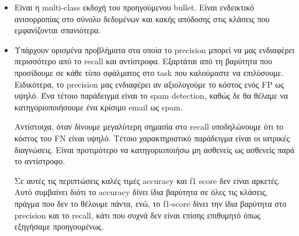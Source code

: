\begin{itemize}
	\item Είναι η multi-class εκδοχή του προηγούμενου bullet. Είναι ενδεικτικό ανισορροπίας στο σύνολο δεδομένων και κακής απόδοσης στις κλάσεις που εμφανίζονται σπανιότερα. 
	
	\item Υπάρχουν ορισμένα προβλήματα στα οποία το precision μπορεί να μας ενδιαφέρει περισσότερο από το recall και αντίστροφα. Εξαρτάται από τη βαρύτητα που προσίδουμε σε κάθε τύπο σφάλματος στο task που καλούμαστε να επιλύσουμε. Ειδικότερα, το precision μας ενδιαφέρει αν αξιολογούμε το κόστος ενός FP ως υψηλό. Ένα τέτοιο παράδειγμα είναι το spam detection, καθώς δε θα θέλαμε να κατηγοριοποιήσουμε ένα κρίσιμο email ως spam. 
	
	Αντίστοιχα, όταν δίνουμε μεγαλύτερη σημασία στο recall υποδηλώνουμε ότι το κόστος του FN είναι υψηλό. Τέτοιο χαρακτηριστικό παράδειγμα είναι οι ιατρικές διαγνώσεις. Είναι προτιμότερο να κατηγοριοποιήσω μη ασθενείς ως ασθενείς παρά το αντίστροφο.
	
	Σε αυτές τις περιπτώσεις καλές τιμές accuracy και f1 score δεν είναι αρκετές. Αυτό συμβαίνει διότι το accuracy δίνει ίδια βαρύτητα σε όλες τις κλάσεις, πράγμα που δεν το θέλουμε πάντα, ενώ, το f1-score δίνει την ίδια βαρύτητα στο precision και το recall, κάτι που συχνά δεν είναι επίσης επιθυμητό όπως εξηγήσαμε προηγουμένως.  
\end{itemize}
